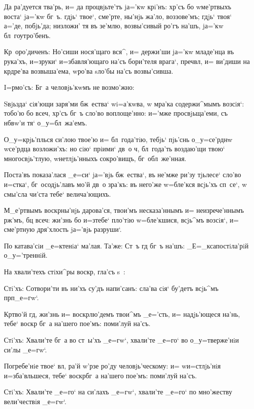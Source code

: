 Да ра'дуется тва'рь, и= да процвjьте'тъ jа='кw крi'нъ: 
хр'съ бо w\т ме'ртвыхъ воста` jа='кw бг~ъ. гдjь` 
твое`, сме'рте, ны'нjь жа'ло, воззове'мъ; гдjь` твоя` 
а='де, побjь'да; низложи' тя въ зе'млю, возвы'сивый ро'гъ 
на'шъ, jа='кw бл~гоутро'бенъ.

Кр~оро'диченъ: Но'сиши нося'щаго вся^, и= 
держи'ши jа='кw младе'нца въ рука'хъ, и=з\ъ руки` 
и=збавля'ющаго на'съ бори'теля врага`, преч вл, 
и= ви'диши на кр дре'ва возвыша'ема, w\т ро'ва sло'бы 
на'съ возвы'сивша. 

 I=рмо'съ: Бг~а человjь'кwмъ не возмо'жно:

Sвjьзда` сiя'ющи заря'ми бж~ества` w\т i=а'кwва, w\т 
мра'ка содержи^мымъ возсiя`: тобо'ю бо всеч, 
хр'съ бг~ъ сло'во воплоще'нно: и='мже просвjьща'еми, 
съ нб вw'и тя` о_у=бл~жа'емъ.

О_у=крjь'плься си'лою твое'ю и= бл~года'тiю, тебjь` 
пjь'снь о_у=се'рднw w\т се'рдца возложи'хъ: но сiю` 
прiими` дв~о ч, бл~года'ть воздаю'щи твою` 
многосвjь'тлую, w\т нетлjь'нныхъ сокро'вищъ, 
бг~обл~же'нная.

Поста'въ показа'лася _е=си` jа='вjь бж~ества`, въ 
не'мже ри'зу тjьлесе` сло'во и=стка`, бг~осодjь'лавъ мо'й 
дв~о зра'къ: въ него'же w=бле'кся всjь'хъ сп~се`, w\т 
смы'сла чи'ста тебе` велича'ющихъ.

М_е'ртвымъ воскр ны'нjь дарова'ся, твои'мъ 
несказа'ннымъ и= неизрече'ннымъ рж'мъ, бц 
всеч: жи'знь бо и=з\ъ тебе` пло'тiю w=бле'кшися, 
всjь^мъ возсiя`, и= сме'ртную дря'хлость jа='вjь 
разруши`.

По катава'сiи _е=ктенiа` ма'лая. Та'же: Ст~ъ гд 
бг~ъ на'шъ: _Е=_ксапостiла'рiй о_у='треннiй. 

На хвали'техъ стiхи^ры воскр, гла'съ s~:

Стi'хъ: Сотвори'ти въ ни'хъ су'дъ напи'санъ: сла'ва 
сiя` бу'детъ всjь^мъ прп _е=гw`.

Кр тво'й гд, жи'знь и= воскр лю'демъ 
твои^мъ _е='сть, и= надjь'ющеся на'нь, тебе` воскр 
бг~а на'шего пое'мъ: поми'луй на'съ.

Стi'хъ: Хвали'те бг~а во ст~ы'хъ _е=гw`, хвали'те 
_е=го` во о_у=тверже'нiи си'лы _е=гw`.

Погребе'нiе твое` вл, ра'й w'рзе ро'ду 
человjь'ческому: и= w\т и=стлjь'нiя и=зба'вльшеся, тебе` 
воскр бг~а на'шего пое'мъ: поми'луй на'съ.

Стi'хъ: Хвали'те _е=го` на си'лахъ _е=гw`, хвали'те 
_е=го` по мно'жеству вели'чествiя _е=гw`.

